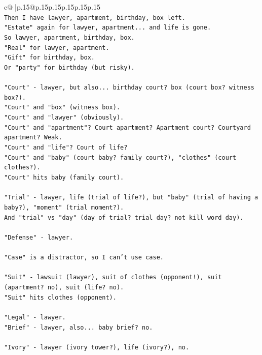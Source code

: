 \documentclass{article}
\begin{document}
{\begin{supertabular}{c@{$\;$}|p{.15\linewidth}@{}p{.15\linewidth}p{.15\linewidth}p{.15\linewidth}p{.15\linewidth}p{.15\linewidth}}
{{{\\ 
\texttt{Then I have lawyer, apartment, birthday, box left.} \\
\texttt{"Estate" again for lawyer, apartment... and life is gone.} \\
\texttt{So lawyer, apartment, birthday, box.} \\
\texttt{"Real" for lawyer, apartment.} \\
\texttt{"Gift" for birthday, box.} \\
\texttt{Or "party" for birthday (but risky).} \\
\\ 
\texttt{"Court" {-} lawyer, but also... birthday court? box (court box? witness box?).} \\
\texttt{"Court" and "box" (witness box).} \\
\texttt{"Court" and "lawyer" (obviously).} \\
\texttt{"Court" and "apartment"? Court apartment? Apartment court? Courtyard apartment? Weak.} \\
\texttt{"Court" and "life"? Court of life?} \\
\texttt{"Court" and "baby" (court baby? family court?), "clothes" (court clothes?).} \\
\texttt{"Court" hits baby (family court).} \\
\\ 
\texttt{"Trial" {-} lawyer, life (trial of life?), but "baby" (trial of having a baby?), "moment" (trial moment?).} \\
\texttt{And "trial" vs "day" (day of trial? trial day? not kill word day).} \\
\\ 
\texttt{"Defense" {-} lawyer.} \\
\\ 
\texttt{"Case" is a distractor, so I can't use case.} \\
\\ 
\texttt{"Suit" {-} lawsuit (lawyer), suit of clothes (opponent!), suit (apartment? no), suit (life? no).} \\
\texttt{"Suit" hits clothes (opponent).} \\
\\ 
\texttt{"Legal" {-} lawyer.} \\
\texttt{"Brief" {-} lawyer, also... baby brief? no.} \\
\\ 
\texttt{"Ivory" {-} lawyer (ivory tower?), life (ivory?), no.} \\
}}}
\end{supertabular}}
\end{document}

